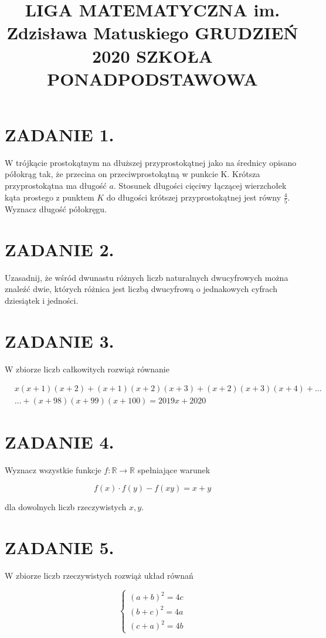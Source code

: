 \documentclass[10pt]{article}
\title{LIGA MATEMATYCZNA im. Zdzisława Matuskiego GRUDZIEŃ 2020 SZKOŁA PONADPODSTAWOWA }
\author{}
\date{}
\begin{document}
\maketitle
\section*{ZADANIE 1.}
W trójkącie prostokątnym na dłuższej przyprostokątnej jako na średnicy opisano półokrąg tak, że przecina on przeciwprostokątną w punkcie K. Krótsza przyprostokątna ma długość \(a\). Stosunek długości cięciwy łączącej wierzchołek kąta prostego z punktem \(K\) do długości krótszej przyprostokątnej jest równy \(\frac{4}{5}\). Wyznacz długość półokręgu.

\section*{ZADANIE 2.}
Uzasadnij, że wśród dwunastu różnych liczb naturalnych dwucyfrowych można znaleźć dwie, których różnica jest liczbą dwucyfrową o jednakowych cyfrach dziesiątek i jedności.

\section*{ZADANIE 3.}
W zbiorze liczb całkowitych rozwiąż równanie

\[
\begin{aligned}
& x(x+1)(x+2)+(x+1)(x+2)(x+3)+(x+2)(x+3)(x+4)+\ldots \\
& \ldots+(x+98)(x+99)(x+100)=2019 x+2020
\end{aligned}
\]

\section*{ZADANIE 4.}
Wyznacz wszystkie funkcje \(f: \mathbb{R} \rightarrow \mathbb{R}\) spełniające warunek

\[
f(x) \cdot f(y)-f(x y)=x+y
\]

dla dowolnych liczb rzeczywistych \(x, y\).

\section*{ZADANIE 5.}
W zbiorze liczb rzeczywistych rozwiąż układ równań

\[
\left\{\begin{array}{l}
(a+b)^{2}=4 c \\
(b+c)^{2}=4 a \\
(c+a)^{2}=4 b
\end{array}\right.
\]
\end{document}
